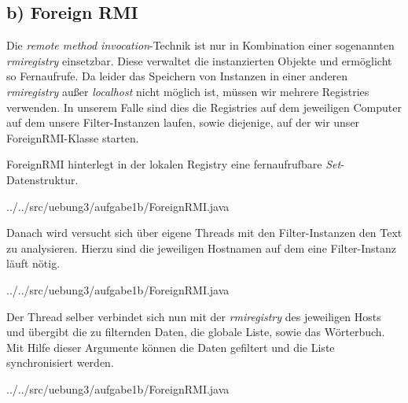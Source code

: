 \subsection*{b) Foreign RMI}

Die \textit{remote method invocation}-Technik ist nur in Kombination einer sogenannten \textit{rmiregistry} einsetzbar.
Diese verwaltet die instanzierten Objekte und ermöglicht so Fernaufrufe.
Da leider das Speichern von Instanzen in einer anderen \textit{rmiregistry} außer \textit{localhost}
nicht möglich ist, müssen wir mehrere Registries verwenden.
In unserem Falle sind dies die Registries auf dem jeweiligen Computer auf dem unsere Filter-Instanzen laufen,
sowie diejenige, auf der wir unser ForeignRMI-Klasse starten.

ForeignRMI hinterlegt in der lokalen Registry eine fernaufrufbare \textit{Set}-Datenstruktur.

{../../src/uebung3/aufgabe1b/ForeignRMI.java}

Danach wird versucht sich über eigene Threads mit den Filter-Instanzen den Text zu analysieren.
Hierzu sind die jeweiligen Hostnamen auf dem eine Filter-Instanz läuft nötig.

{../../src/uebung3/aufgabe1b/ForeignRMI.java}

Der Thread selber verbindet sich nun mit der \textit{rmiregistry} des jeweiligen Hosts und 
übergibt die zu filternden Daten, die globale Liste, sowie das Wörterbuch.
Mit Hilfe dieser Argumente können die Daten gefiltert und die Liste synchronisiert werden.

{../../src/uebung3/aufgabe1b/ForeignRMI.java}
